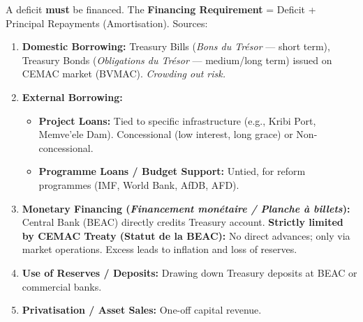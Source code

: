 \documentclass[11pt]{article}
\begin{document}
\begin{definition}
A deficit \textbf{must} be financed. The \textbf{Financing Requirement} = Deficit + Principal Repayments (Amortisation). Sources:
\begin{enumerate}
    \item \textbf{Domestic Borrowing:} Treasury Bills (\emph{Bons du Trésor} — short term), Treasury Bonds (\emph{Obligations du Trésor} — medium/long term) issued on CEMAC market (BVMAC). \emph{Crowding out risk.}
    \item \textbf{External Borrowing:}
        \begin{itemize}
            \item \textbf{Project Loans:} Tied to specific infrastructure (e.g., Kribi Port, Memve'ele Dam). Concessional (low interest, long grace) or Non-concessional.
            \item \textbf{Programme Loans / Budget Support:} Untied, for reform programmes (IMF, World Bank, AfDB, AFD).
        \end{itemize}
    \item \textbf{Monetary Financing (\emph{Financement monétaire / Planche à billets}):} Central Bank (BEAC) directly credits Treasury account. \textbf{Strictly limited by CEMAC Treaty (Statut de la BEAC):} No direct advances; only via market operations. Excess leads to inflation and loss of reserves.
    \item \textbf{Use of Reserves / Deposits:} Drawing down Treasury deposits at BEAC or commercial banks.
    \item \textbf{Privatisation / Asset Sales:} One-off capital revenue.
\end{enumerate}
\end{definition}
\end{document}
